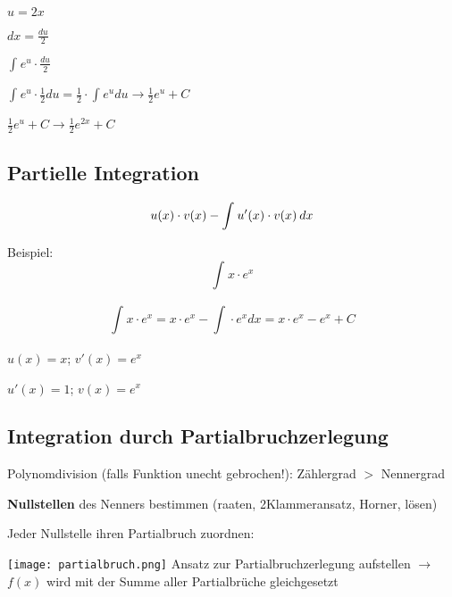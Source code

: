 \begin{multicols*}{3}
\begin{multicols*}{2}
        \columnbreak

        { $ u = 2x $}

        { $ dx = \frac{du}{2} $}

        { $ \int_{}{}e^u \cdot  \frac{du}{2} $}

    \end{multicols*}

    { $ \int_{}{}e^u \cdot  \frac{1}{2}du = \frac{1}{2} \cdot  \int_{}{}e^u du \rightarrow \frac{1}{2} e^u + C   $}


    { $\frac{1}{2} e^u + C \rightarrow \frac{1}{2} e^{2x} + C$ }

    \columnbreak


    \subsection{Partielle Integration}
    {\large $$u(x)\cdot v(x) - \int_{}^{}u'(x) \cdot v(x) \hspace{2px}  dx$$}

    \begin{multicols*}{2}
        {Beispiel:}
        \[ \int_{}{}x\cdot e^x\]

        $$ \int_{}{}x\cdot e^x = x\cdot e^x -  \int_{}{}\cdot e^x dx = x\cdot e^x - e^x + C $$
        \columnbreak

        {$u(x)=x$; $v'(x)=e^x$}

        {$u'(x)=1$; $v(x)=e^x$}

    \end{multicols*}





    \subsection{Integration durch Partialbruchzerlegung}
    {    Polynomdivision (falls Funktion unecht gebrochen!): Zählergrad  $>$ Nennergrad }



    { \textbf{Nullstellen} des Nenners bestimmen (raaten, 2Klammeransatz, Horner, lösen)}

    { Jeder Nullstelle ihren Partialbruch zuordnen:}

    \texttt{[image: partialbruch.png]}
    { Ansatz zur Partialbruchzerlegung aufstellen $\rightarrow$ $f(x)$ wird mit der Summe aller Partialbrüche gleichgesetzt}


\end{multicols*}
